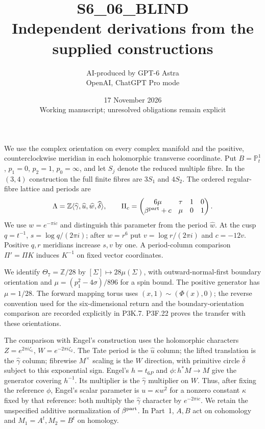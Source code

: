 \documentclass[11pt,a4paper]{article}
\title{S6\_06\_BLIND\\Independent derivations from the supplied constructions}
\author{AI-produced by GPT-6 Astra\\OpenAI, ChatGPT Pro mode}
\date{17 November 2026\\Working manuscript; unresolved obligations remain explicit}
\newcommand{\Z}{\mathbb Z}
\newcommand{\Pp}{\mathbb P}
\begin{document}
\maketitle
\noindent We use the complex orientation on every complex manifold and the positive, counterclockwise meridian in each holomorphic transverse coordinate. Put $B=\Pp^1_t$, $p_1=0$, $p_2=1$, $p_0=\infty$, and let $S_j$ denote the reduced multiple fibre. In the $(3,4)$ construction the full finite fibres are $3S_1$ and $4S_2$. The ordered regular-fibre lattice and periods are
\[
 \Lambda=\Z\langle\widehat\gamma,\widehat u,\widehat w,\widehat\delta\rangle,
 \qquad\Pi_c=\begin{pmatrix}6\mu&\tau&1&0\\ \beta^{\rm part}+c&\mu&0&1\end{pmatrix}.
\]
We use $w=e^{-\pi i c}$ and distinguish this parameter from the period $\widehat w$. At the cusp $q=t^{-1}$, $s=\log q/(2\pi i)$; after $w=r^6$ put $v=\log r/(2\pi i)$ and $c=-12v$. Positive $q,r$ meridians increase $s,v$ by one. A period-column comparison $\Pi'=\Pi K$ induces $K^{-1}$ on fixed vector coordinates.

We identify $\Theta_7=\Z/28$ by $[\Sigma]\mapsto28\mu(\Sigma)$, with outward-normal-first boundary orientation and $\mu=(p_1^2-4\sigma)/896$ for a spin bound. The positive generator has $\mu=1/28$. The forward mapping torus uses $(x,1)\sim(\Phi(x),0)$; the reverse convention used for the six-dimensional return and the boundary-orientation comparison are recorded explicitly in P3K.7. P3F.22 proves the transfer with these orientations.

The comparison with Engel's construction uses the holomorphic characters $Z=e^{2\pi i\zeta_1}$, $W=e^{-2\pi i\zeta_2}$. The Tate period is the $\widehat u$ column; the lifted translation is the $\widehat\gamma$ column; fibrewise $M^\times$ scaling is the $W$ direction, with primitive circle $\widehat\delta$ subject to this exponential sign. Engel's $h=t_{6P}$ and $\phi:h^*M\to M$ give the generator covering $h^{-1}$. Its multiplier is the $\widehat\gamma$ multiplier on $W$. Thus, after fixing the reference $\phi$, Engel's scalar parameter is $u=\kappa w^2$ for a nonzero constant $\kappa$ fixed by that reference: both multiply the $\widehat\gamma$ character by $e^{-2\pi ic}$. We retain the unspecified additive normalization of $\beta^{\rm part}$. In Part~1, $A,B$ act on cohomology and $M_1=A^t,M_2=B^t$ on homology.
\tableofcontents\clearpage
{}

\end{document}
